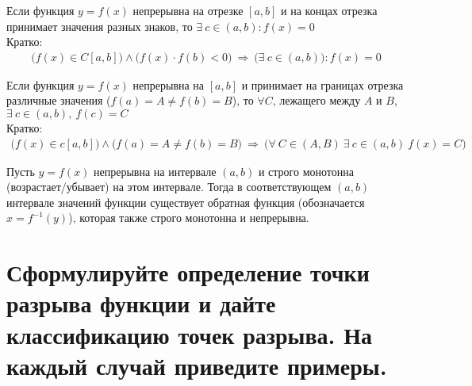 \begin{theorem}
  Если функция $y = f(x)$ непрерывна на отрезке $[a, b]$ и на концах отрезка принимает значения разных знаков, то $\exists\ c \in (a, b)\colon f(x) = 0$\\
  Кратко: \vspace{-\topsep}
  \begin{gather*}
    \big(f(x) \in C[a, b]\big) \wedge \big(f(x) \cdot f(b)< 0\big)\ \Rightarrow\ \big(\exists\ c \in (a, b)\big)\colon f(x) = 0
  \end{gather*}
\end{theorem}
  \begin{theorem}
  Если функция $y = f(x)$ непрерывна на $[a, b]$ и принимает на границах отрезка различные значения ($f(a) = A \ne f(b) = B$), то $\forall C$, лежащего между $A$ и $B$, $\exists\ c \in (a, b),\ f(c) = C$\\
  Кратко: \vspace{-\topsep}
  \begin{gather*}
    \big(f(x) \in c[a, b]\big) \wedge \big(f(a) = A \ne f(b) = B\big)\ \Rightarrow\ \big(\forall\ C \in (A, B)\ \exists\ c \in (a, b)\ f(x) = C\big)
  \end{gather*}
\end{theorem}
\begin{theorem}
  Пусть $y = f(x)$ непрерывна на интервале $(a, b)$ и строго монотонна (возрастает/убывает) на этом интервале. Тогда в соответствующем $(a, b)$ интервале значений функции существует обратная функция \big(обозначается $x = f^{-1}(y)$\big), которая также строго монотонна и непрерывна.
\end{theorem}
\newpage
\section{Сформулируйте определение точки разрыва функции и дайте классификацию точек разрыва. На каждый случай приведите примеры.}

